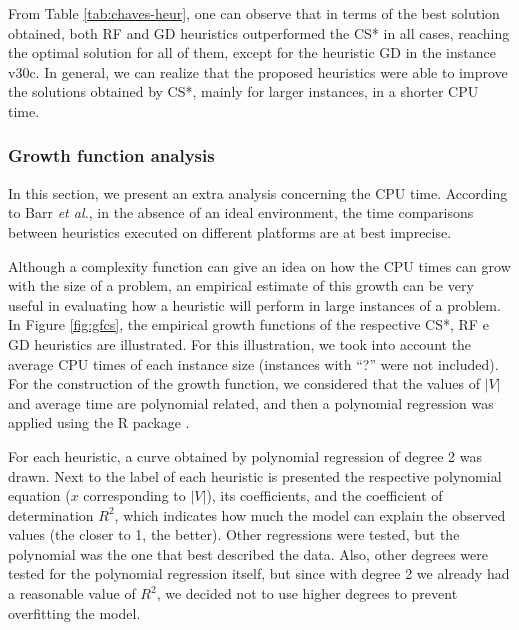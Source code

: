 \documentclass{ro}
\begin{document}
From Table \ref{tab:chaves-heur}, one can observe that in terms of the best solution obtained,  both RF and GD heuristics outperformed the CS* in all cases, reaching the optimal solution for all of them, except for the heuristic GD in the instance v30c. In general, we can realize that the proposed heuristics were able to improve the solutions obtained by CS*, mainly for  larger instances, in a shorter CPU time.


\subsubsection{Growth function analysis}

In this section, we present an extra analysis concerning the CPU time. According to Barr \textit{et al.}\cite{barr2001guidelines}, in the absence of an ideal environment, the time comparisons between heuristics executed on different platforms are at best imprecise.

Although a complexity function can give an idea on how the CPU times can grow with the size of a problem, an empirical estimate of this growth can be very useful in evaluating how a heuristic will perform in large instances of a problem. In Figure \ref{fig:gfcs}, the empirical growth functions of the respective CS*, RF e GD heuristics are illustrated. For this illustration, we took into account the average CPU times of each instance size (instances with ``?'' were not included). For the construction of the growth function, we considered that the values of $|V|$ and average time are polynomial related, and then a polynomial regression was applied using the R package \cite{r-package}.

For each heuristic, a curve obtained by polynomial regression of degree 2 was drawn. Next to the label of each heuristic is presented the respective polynomial equation ($x$ corresponding to $|V|$), its coefficients, and the coefficient of determination $R^2$, which indicates how much the model can explain the observed values (the closer to 1, the better). Other regressions were tested, but the polynomial was the one that best described the data. Also, other degrees were tested for the polynomial regression itself, but since with degree 2 we already had a reasonable value of $R^2$, we decided not to use higher degrees to prevent overfitting the model.
\end{document}
